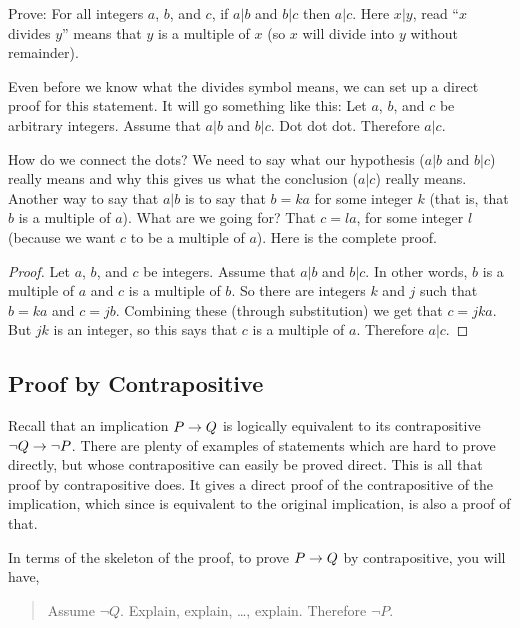 \documentclass[12pt]{article}
\begin{document}
 
\begin{example}
Prove: For all integers $a$, $b$, and $c$, if $a|b$ and $b|c$ then $a|c$.  Here $x|y$, read ``$x$ divides $y$'' means that $y$ is a multiple of $x$ (so $x$ will divide into $y$ without remainder).

\begin{solution}
Even before we know what the divides symbol means, we can set up a direct proof for this statement.  It will go something like this: Let $a$, $b$, and $c$ be arbitrary integers.  Assume that $a|b$ and $b|c$.  Dot dot dot.  Therefore $a|c$.

How do we connect the dots?  We need to say what our hypothesis ($a|b$ and $b|c$) really means and why this gives us what the conclusion ($a|c$) really means.  Another way to say that $a|b$ is to say that $b = ka$ for some integer $k$ (that is, that $b$ is a multiple of $a$).  What are we going for?  That $c = la$, for some integer $l$ (because we want $c$ to be a multiple of $a$).  Here is the complete proof.

\begin{proof}
Let $a$, $b$, and $c$ be integers.  Assume that $a|b$ and $b|c$.  In other words, $b$ is a multiple of $a$ and $c$ is a multiple of $b$.  So there are integers $k$ and $j$ such that $b = ka$ and $c = jb$.  Combining these (through substitution) we get that $c = jka$.  But $jk$ is an integer, so this says that $c$ is a multiple of $a$.  Therefore $a|c$.
\end{proof}
\end{solution}
\end{example} 
 
 

\subsection*{Proof by Contrapositive}

Recall that an implication $P \rightarrow Q$ is logically equivalent to its contrapositive $\neg Q \rightarrow \neg P$.  There are plenty of examples of statements which are hard to prove directly, but whose contrapositive can easily be proved direct.  This is all that proof by contrapositive does.  It gives a direct proof of the contrapositive of the implication, which since is equivalent to the original implication, is also a proof of that.

In terms of the skeleton of the proof, to prove $P \rightarrow Q$ by contrapositive, you will have,

\begin{quote}
Assume $\neg Q$.  Explain, explain, \ldots, explain.  Therefore $\neg P$.
\end{quote}
 
\end{document}
